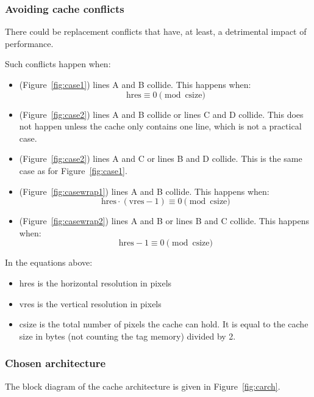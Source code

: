 \documentclass[a4paper,11pt]{article}
\begin{document}
\subsubsection{Avoiding cache conflicts}
There could be replacement conflicts that have, at least, a detrimental impact of performance.

Such conflicts happen when:
\begin{itemize}
\item (Figure~\ref{fig:case1}) lines A and B collide. This happens when:
\begin{equation*}
\text{hres} \equiv 0 \pmod{\text{csize}}
\end{equation*}
\item (Figure~\ref{fig:case2}) lines A and B collide or lines C and D collide. This does not happen unless the cache only contains one line, which is not a practical case.
\item (Figure~\ref{fig:case2}) lines A and C or lines B and D collide. This is the same case as for Figure~\ref{fig:case1}.
\item (Figure~\ref{fig:casewrap1}) lines A and B collide. This happens when:
\begin{equation*}
\text{hres}\cdot(\text{vres}-1) \equiv 0 \pmod{\text{csize}}
\end{equation*}
\item (Figure~\ref{fig:casewrap2}) lines A and B or lines B and C collide. This happens when:
\begin{equation*}
\text{hres}-1 \equiv 0 \pmod{\text{csize}}
\end{equation*}
\end{itemize}

In the equations above:
\begin{itemize}
\item hres is the horizontal resolution in pixels
\item vres is the vertical resolution in pixels
\item csize is the total number of pixels the cache can hold. It is equal to the cache size in bytes (not counting the tag memory) divided by 2.
\end{itemize}

\subsubsection{Chosen architecture}
The block diagram of the cache architecture is given in Figure~\ref{fig:carch}.
\end{document}
